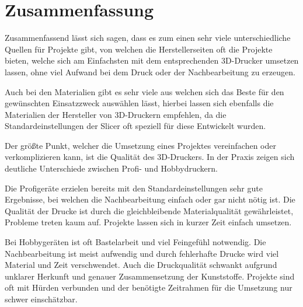 \chapter{Zusammenfassung}
Zusammenfassend lässt sich sagen, dass es zum einen sehr viele unterschiedliche Quellen für Projekte gibt, von welchen die Herstellerseiten oft die Projekte bieten, welche sich am Einfachsten mit dem entsprechenden 3D-Drucker umsetzen lassen, ohne viel Aufwand bei dem Druck oder der Nachbearbeitung zu erzeugen.

Auch bei den Materialien gibt es sehr viele aus welchen sich das Beste für den gewünschten Einsatzzweck auswählen lässt, hierbei lassen sich ebenfalls die Materialien der Hersteller von 3D-Druckern empfehlen, da die Standardeinstellungen der Slicer oft speziell für diese Entwickelt wurden.

Der größte Punkt, welcher die Umsetzung eines Projektes vereinfachen oder verkomplizieren kann, ist die Qualität des 3D-Druckers. In der Praxis zeigen sich deutliche Unterschiede zwischen Profi- und Hobbydruckern.

Die Profigeräte erzielen bereits mit den Standardeinstellungen sehr gute Ergebnisse, bei welchen die Nachbearbeitung einfach oder gar nicht nötig ist. Die Qualität der Drucke ist durch die gleichbleibende Materialqualität gewährleistet, Probleme treten kaum auf. Projekte lassen sich in kurzer Zeit einfach umsetzen.

Bei Hobbygeräten ist oft Bastelarbeit und viel Feingefühl notwendig. Die Nachbearbeitung ist meist aufwendig und durch fehlerhafte Drucke wird viel Material und Zeit verschwendet. Auch die Druckqualität schwankt aufgrund unklarer Herkunft und genauer Zusammensetzung der Kunststoffe. Projekte sind oft mit Hürden verbunden und der benötigte Zeitrahmen für die Umsetzung nur schwer einschätzbar.
